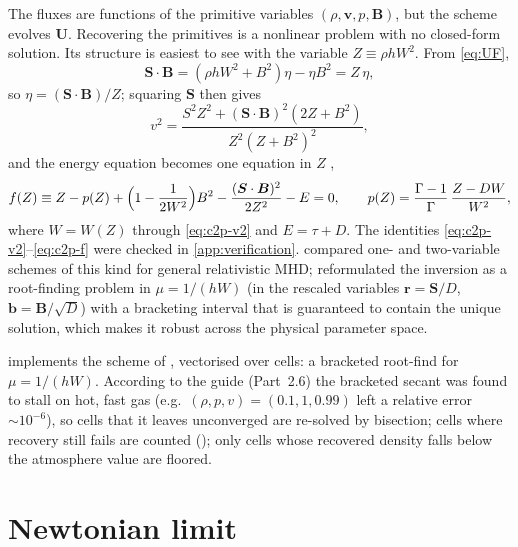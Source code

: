 \documentclass[11pt,a4paper,oneside,openany]{book}
\newcommand{\textcite}{\citet}
\newcommand{\parencite}{\citep}
\theoremstyle{definition}
\theoremstyle{plain}
\theoremstyle{remark}
\newcommand{\vv}{\bm{v}}
\newcommand{\BB}{\bm{B}}
\newcommand{\SSS}{\bm{S}}
\newcommand{\UU}{\bm{U}}
\newcommand{\vB}{\eta}
\newcommand{\code}[1]{\texttt{\detokenize{#1}}}
\newcommand{\file}[1]{\texttt{\detokenize{#1}}}
\begin{document}
The fluxes are functions of the primitive variables $(\rho,\vv,p,\BB)$, but the scheme
evolves $\UU$. Recovering the primitives is a nonlinear problem with no closed-form
solution. Its structure is easiest to see with the variable $Z\equiv\rho hW^2$. From
\eqref{eq:UF},
\begin{equation}
\SSS\cdot\BB=(\rho hW^2+B^2)\vB-\vB B^2=Z\,\vB ,
\end{equation}
so $\vB=(\SSS\cdot\BB)/Z$; squaring $\SSS$ then gives
\begin{equation}\label{eq:c2p-v2}
v^2=\frac{S^2Z^2+(\SSS\cdot\BB)^2(2Z+B^2)}{Z^2(Z+B^2)^2},
\end{equation}
and the energy equation becomes one equation in $Z$ \parencite{MignoneBodo2006},
\begin{equation}\label{eq:c2p-f}
f(Z)\equiv Z-p(Z)+\Bigl(1-\frac{1}{2W^2}\Bigr)B^2-\frac{(\SSS\cdot\BB)^2}{2Z^2}-E=0,
\qquad
p(Z)=\frac{\Gamma-1}{\Gamma}\,\frac{Z-DW}{W^2},
\end{equation}
where $W=W(Z)$ through \eqref{eq:c2p-v2} and $E=\tau+D$. The identities
\eqref{eq:c2p-v2}--\eqref{eq:c2p-f} were checked in \cref{app:verification}.
\textcite{Noble2006} compared one- and two-variable schemes of this kind for general
relativistic MHD; \textcite{Kastaun2021} reformulated the inversion as a root-finding
problem in $\mu=1/(hW)$ (in the rescaled variables $\bm r=\SSS/D$, $\bm b=\BB/\sqrt D$) with a bracketing interval that is guaranteed to contain
the unique solution, which makes it robust across the physical parameter space.

\begin{codebox}
\file{HLLD/src/physics/c2p.py} implements the scheme of \textcite{Kastaun2021},
vectorised over cells: a bracketed root-find for $\mu=1/(hW)$. According to the
guide (Part~2.6) the bracketed secant was found to stall on hot, fast gas
(e.g.\ $(\rho,p,v)=(0.1,1,0.99)$ left a relative error $\sim10^{-6}$), so cells that it
leaves unconverged are re-solved by bisection; cells where recovery still fails are
counted (\code{c2p_bad}); only cells whose recovered density falls below the atmosphere
value are floored.
\end{codebox}

\section{Newtonian limit}\label{sec:newtonian}
\end{document}
